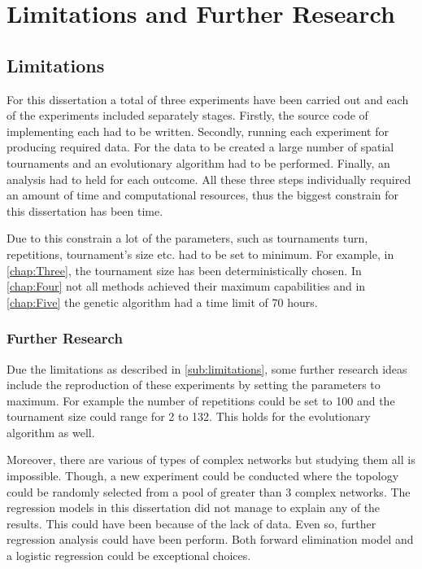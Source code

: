 \section{Limitations and Further Research}
\subsection{Limitations}
\label{sub:limitations}
For this dissertation a total of three experiments have been carried out and
each of the experiments included separately stages. Firstly, the source code of implementing
each had to be written. Secondly, running each experiment for producing required data.
For the data to be created a large number of spatial
tournaments and an evolutionary algorithm had to be performed. Finally, an
analysis had to held for each outcome. All these three steps individually required
an amount of time and computational resources, thus the biggest constrain for
this dissertation has been time.

Due to this constrain a lot of the parameters, such as tournaments turn, repetitions,
tournament's size etc. had to be set to minimum. For example, in \autoref{chap:Three},
the tournament size has been deterministically chosen. In \autoref{chap:Four}
not all methods achieved their maximum capabilities and in \autoref{chap:Five} the
genetic algorithm had a time limit of 70 hours.

\subsubsection{Further Research}

Due the limitations as described in \autoref{sub:limitations}, some further
research ideas include the reproduction of these experiments by setting the
parameters to maximum. For example the number of repetitions could be set to 100
and the tournament size could range for 2 to 132. This holds for the evolutionary
algorithm as well.

Moreover, there are various of types of complex networks but studying them all
is impossible. Though, a new experiment could be conducted where the topology
could be randomly selected from a pool of greater than 3 complex networks. The
regression models in this dissertation did not manage to explain any of the results.
This could have been because of the lack of data. Even so, further regression
analysis could have been perform. Both forward elimination model and a logistic
regression could be exceptional choices.

